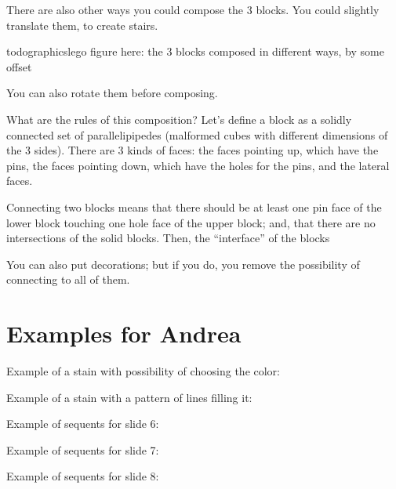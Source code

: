 There are also other ways you could compose the 3 blocks. You could slightly translate them, to create stairs.

todographics{lego figure here: the 3 blocks composed in different ways, by some offset}

You can also rotate them before composing.


What are the rules of this composition? Let's define a block as a solidly connected set of parallelipipedes (malformed cubes with different dimensions of the 3 sides). There are 3 kinds of faces: the faces pointing up, which have the pins, the faces pointing down, which have the holes for the pins, and the lateral faces.

Connecting two blocks means that there should be at least one pin face of the lower block touching one hole face of the upper block; and, that there are no intersections of the solid blocks. Then, the ``interface'' of the blocks


You can also put decorations; but if you do, you remove the possibility of connecting to all of them.



\section{Examples for Andrea}


Example of a stain with possibility of choosing the color:
\begin{center}
\end{center}

Example of a stain with a pattern of lines filling it:

\stainfilled


Example of sequents for slide 6:
\begin{center}
\end{center}

Example of sequents for slide 7:
\begin{center}
\end{center}

Example of sequents for slide 8:

\begin{center}
\end{center}

